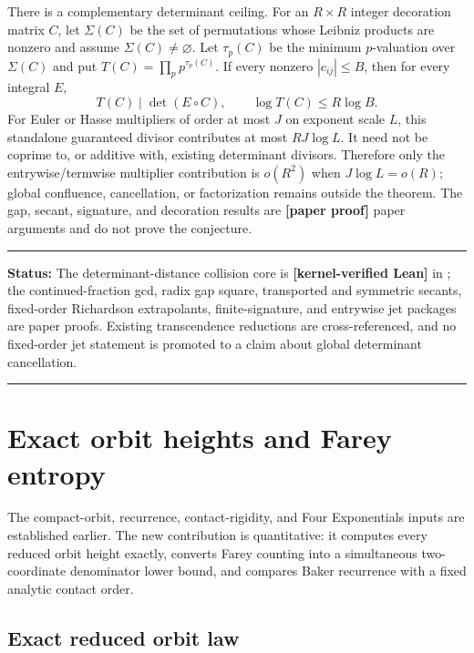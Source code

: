 \documentclass[11pt,oneside]{article}
\theoremstyle{definition}
\theoremstyle{remark}
\newcommand{\lean}[1]{\texttt{\detokenize{#1}}}
\newcommand{\statuslean}{\textcolor{leanblue}{\textbf{[kernel-verified Lean]}}}
\newcommand{\statusnew}{\textcolor{newgreen}{\textbf{[paper proof]}}}
\newenvironment{statusbox}[1]
{\begin{center}\begin{minipage}{0.94\textwidth}\raggedright\hbadness=10000\hrule
\vspace{0.45em}\textbf{Status:} #1\par\vspace{0.35em}}
{\vspace{0.35em}\hrule\end{minipage}\end{center}}
\begin{document}
There is a complementary determinant ceiling.  For an $R\times R$ integer decoration
matrix $C$, let $\Sigma(C)$ be the set of permutations whose Leibniz products are nonzero
and assume $\Sigma(C)\ne\varnothing$.  Let $\tau_p(C)$ be the minimum $p$-valuation over
$\Sigma(C)$ and put
$T(C)=\prod_pp^{\tau_p(C)}$.  If every nonzero $|c_{ij}|\le B$, then for every integral $E$,
\begin{equation}
 T(C)\mid\det(E\circ C),\qquad \log T(C)\le R\log B.
 \label{gapjet:eq-decoration-budget}
\end{equation}
For Euler or Hasse multipliers of order at most $J$ on exponent scale $L$, this standalone
guaranteed divisor contributes at most $RJ\log L$.  It need not be coprime to, or additive
with, existing determinant divisors.  Therefore only the entrywise/termwise multiplier
contribution is $o(R^2)$ when $J\log L=o(R)$; global confluence, cancellation, or
factorization remains outside the theorem.  The gap, secant, signature, and decoration
results are \statusnew{} paper arguments and do not prove the conjecture.

\begin{statusbox}{The determinant-distance collision core is \statuslean{} in
\lean{UnimodularGapCollision}; the
continued-fraction gcd, radix gap square, transported and symmetric secants, fixed-order
Richardson extrapolants, finite-signature, and entrywise jet packages are paper proofs.
Existing transcendence reductions are cross-referenced, and no fixed-order
jet statement is promoted to a claim about global determinant cancellation.}
\end{statusbox}

\section{Exact orbit heights and Farey entropy}
\label{sec:orbit-height-entropy}

The compact-orbit, recurrence, contact-rigidity, and Four Exponentials inputs are established
earlier.  The new contribution is quantitative: it computes every reduced orbit
height exactly, converts Farey counting into a simultaneous two-coordinate denominator
lower bound, and compares Baker recurrence with a fixed analytic contact order.

\subsection{Exact reduced orbit law}
\label{orbitheight:orbit}
\end{document}

